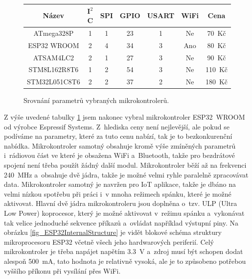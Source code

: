 \begin{figure}[h]
    \centering
    \begin{tabular}{c|cccccc}
        \textbf{Název}                         & \textbf{I$^2$C} & \textbf{SPI} & \textbf{GPIO} & \textbf{USART} & \textbf{WiFi} & \textbf{Cena} \\ \hline
        ATmega328P \cite{dat_ATmega328p}       & 1 & 1 & 23 & 1 & Ne  & 70~Kč \\
        ESP32 WROOM \cite{dat_ESP32-WROOM}     & 2 & 4 & 34 & 3 & Ano & 80~Kč \\
        ATSAM4LC2 \cite{dat_ATSAM4LC2}         & 2 & 1 & 27 & 3 & Ne  & 90~Kč \\
        STM8L162R8T6 \cite{dat_STM8L162R8T6}   & 1 & 2 & 54 & 3 & Ne  & 110~Kč \\
        STM32L051C8T6 \cite{dat_STM32L051C8T6} & 2 & 2 & 37 & 2 & Ne  & 180~Kč
        
    \end{tabular}
    \caption{Srovnání parametrů vybraných mikrokontrolerů.}
    \label{tab_MCU}
\end{figure}

Z výše uvedené tabulky \ref{tab_MCU} jsem nakonec vybral mikrokontroler ESP32~WROOM od výrobce Espressif Systems. Z~hlediska ceny není nejlevější, ale pokud se podíváme na parametry, které za tuto cenu nabízí, tak je to bezkonkurenční nabídka. Mikrokontroler samotný obsahuje kromě výše zmíněných parametrů i~rádiovou část ve které je obsažena WiFi a~Bluetooth, takže pro bezdrátové spojení není třeba použít žádný další modul. Mikrokontroler běží až na frekvenci \SI{240}{\mega\hertz} a~obsahuje dvě jádra, takže je možné velmi ryhle paralelně zpracovávat data. Mikrokontroler samotný je navržen pro IoT aplikace, takže je dbáno na velmi nízkou spotřebu při práci i~v mnoha režimech spánku, které je možné aktivovat. Hlavní dvě jádra mikrokontroleru jsou doplněna o~tzv. ULP (Ultra Low Power) koprocesor, který je možné aktivovat v~režimu spánku a~vykonávat tak velice jednoduché sekvence příkazů a~ovládat například výstupní piny. Na obrázku \ref{fig_ESP32InternalStructure} je vidět blokové schéma struktury mikroprocesoru ESP32 včetně všech jeho hardwarových periferií. Celý mikrokontroler je třeba napájet napětím \SI{3,3}{\volt} a~zdroj musí být schopen dodat alespoň \SI{500}{\milli\ampere}, tato hodnota je relativně vysoká, ale je to způsobeno potřebou vyššího příkonu při vysílání přes WiFi.

